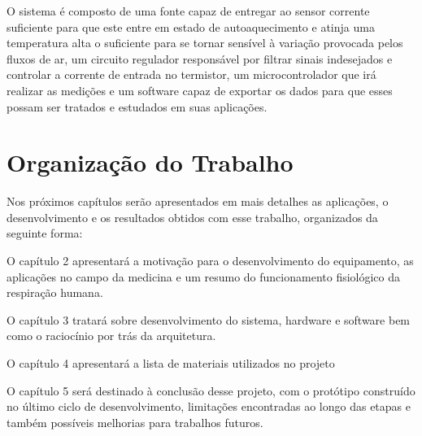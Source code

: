 	O sistema é composto de uma fonte capaz de entregar ao sensor corrente suficiente para que este entre em estado de autoaquecimento e atinja uma temperatura alta o suficiente para se tornar sensível à variação provocada pelos fluxos de ar, um circuito regulador responsável por filtrar sinais indesejados e controlar a corrente de entrada no termistor, um microcontrolador que irá realizar as medições e um software capaz de exportar os dados para que esses possam ser tratados e estudados em suas aplicações.  

  \section{Organização do Trabalho}
  Nos próximos capítulos serão apresentados em mais detalhes as aplicações, o desenvolvimento e os resultados obtidos com esse trabalho, organizados da seguinte forma:
  
  O capítulo 2 apresentará a motivação para o desenvolvimento do equipamento, as aplicações no campo da medicina e um resumo do funcionamento fisiológico da respiração humana. 
  
  O capítulo 3 tratará sobre desenvolvimento do sistema, hardware e software bem como o raciocínio por trás da arquitetura.
  
  O capítulo 4 apresentará a lista de materiais utilizados no projeto
  
  O capítulo 5 será destinado à conclusão desse projeto, com o protótipo construído no último ciclo de desenvolvimento, limitações encontradas ao longo das etapas e também possíveis melhorias para trabalhos futuros.
 